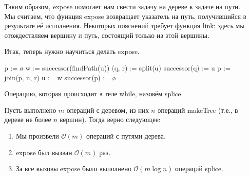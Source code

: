 Таким образом, expose помогает нам свести задачу на дереве к задаче на пути. Мы считаем, что функция expose возвращает указатель на путь, получившийся в результате её исполнения. Некоторых пояснений требует функция link: здесь мы отождествляем вершину и путь, состоящий только из этой вершины.

Итак, теперь нужно научиться делать expose.

\begin{algorithmic}[1]

		\State p := \o {}
			\State w := successor(findPath(u)) 
			\State (q, r) := split(u) 
			 
				\State successor(q) := u 
			\EndIf
			\State p := join(p, u, r) 
			\State u := w 
		\EndWhile
		\State successor(p) := \o
	\EndProcedure

\end{algorithmic}

Операцию, которая происходит в теле while, назовём splice.

\begin{theorem}
Пусть выполнено $m$ операций с деревом, из них $n$ операций makeTree (т.е., в дереве не более $n$ вершин). Тогда верно следующее:

\begin{enumerate}
	\item Мы произвели $\mathcal{O}(m)$ операций с путями дерева.
	\item expose был вызван $\mathcal{O}(m)$ раз.
	\item За все вызовы expose было выполнено $\mathcal{O}(m \log{n})$ операций splice.
\end{enumerate}
\end{theorem}

